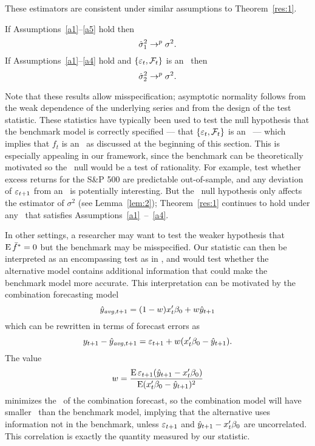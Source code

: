 These estimators are consistent under similar assumptions to
Theorem~\ref{res:1}.

{}
\begin{lem}\label{lem:2}
  If Assumptions~\ref{a1}--\ref{a5} hold then
  \begin{equation*}
    \hat\sigma_1^2 \to^p \sigma^2.
  \end{equation*}
  If Assumptions~\ref{a1}--\ref{a4} hold and $\{\varepsilon_{t},
  \mathcal{F}_t\}$ is an \mds\ then
  \begin{equation*}
    \hat\sigma_2^2 \to^p \sigma^2.
  \end{equation*}
\end{lem}

Note that these results allow misspecification; asymptotic normality
follows from the weak dependence of the underlying series and from the
design of the test statistic. These statistics have typically been
used to test the null hypothesis that the benchmark model is correctly
specified --- that $\{\varepsilon_t, \mathcal{F}_t\}$ is an \mds\ --- which
implies that $f_t$ is an \mds\ as discussed
at the beginning of this section. This is especially appealing in our
framework, since the benchmark can be theoretically motivated so the
\mds\ null would be a test of rationality. For example, \citet{GoW:08}
test whether excess returns for the S\&P 500 are predictable
out-of-sample, and any deviation of $\varepsilon_{t+1}$ from an \mds\ is potentially
interesting. But the \mds\ null hypothesis only affects the estimator
of $\sigma^2$ (see Lemma~\ref{lem:2}); Theorem~\ref{res:1} continues
to hold under any \dgp\ that satisfies Assumptions~\ref{a1}~--~\ref{a4}.

In other settings, a researcher may want to test the weaker hypothesis
that $\operatorname{E} \bar{f}^* = 0$ but the benchmark may be misspecified. Our
statistic can then be interpreted as an encompassing test as in
\citet{HLN:98}, and would test whether the alternative model contains
additional information that could make the benchmark model more
accurate. This interpretation can be motivated by the combination forecasting
model
\begin{equation*}
  \yh_{\mathit{avg},t+1} = (1 - w) x_t'\btrue + w \yh_{t+1}
\end{equation*}
which can be rewritten in terms of forecast errors as
\[
y_{t+1} - \yh_{\mathit{avg},t+1} = \ep_{t+1} + w (x_t'\btrue - \yh_{t+1}).
\]
The value
\[
w = \frac{\E \ep_{t+1} (\yh_{t+1} - x_t'\btrue)}{\E (x_t'\btrue - \yh_{t+1})^2}
\]
minimizes the \mse\ of the combination forecast, so the combination
model will have smaller \mse\ than the benchmark model, implying that
the alternative uses information not in the benchmark, unless
$\varepsilon_{t+1}$ and $\yh_{t+1} - x_t'\btrue$ are uncorrelated. This
correlation is exactly the quantity measured by our statistic.

